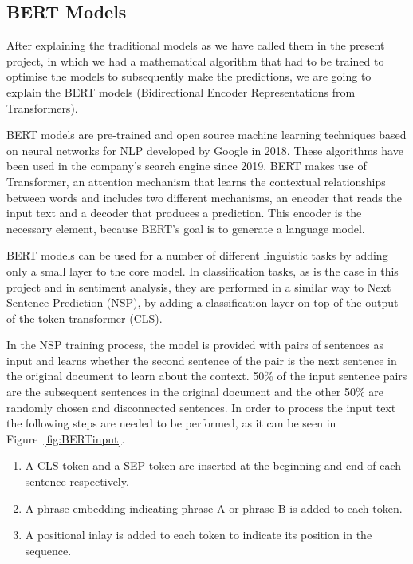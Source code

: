 \subsection{BERT Models}
After explaining the traditional models as we have called them in the present project, in which we had a mathematical algorithm that had to be trained to optimise the models to subsequently make the predictions, we are going to explain the BERT models (Bidirectional Encoder Representations from Transformers). 

BERT models are pre-trained and open source machine learning techniques based on neural networks for NLP developed by Google in 2018. These algorithms have been used in the company's search engine since 2019. BERT makes use of Transformer, an attention mechanism that learns the contextual relationships between words and includes two different mechanisms, an encoder that reads the input text and a decoder that produces a prediction. This encoder is the necessary element, because BERT's goal is to generate a language model.

BERT models can be used for a number of different linguistic tasks by adding only a small layer to the core model. In classification tasks, as is the case in this project and in sentiment analysis, they are performed in a similar way to Next Sentence Prediction (NSP), by adding a classification layer on top of the output of the token transformer (CLS).

In the NSP training process, the model is provided with pairs of sentences as input and learns whether the second sentence of the pair is the next sentence in the original document to learn about the context. 50\% of the input sentence pairs are the subsequent sentences in the original document and the other 50\% are randomly chosen and disconnected sentences. In order to process the input text the following steps are needed to be performed, as it can be seen in Figure~\ref{fig:BERTinput}.

\begin{enumerate}
    \item A CLS token and a SEP token are inserted at the beginning and end of each sentence respectively.
    \item A phrase embedding indicating phrase A or phrase B is added to each token.
    \item A positional inlay is added to each token to indicate its position in the sequence.
\end{enumerate}

